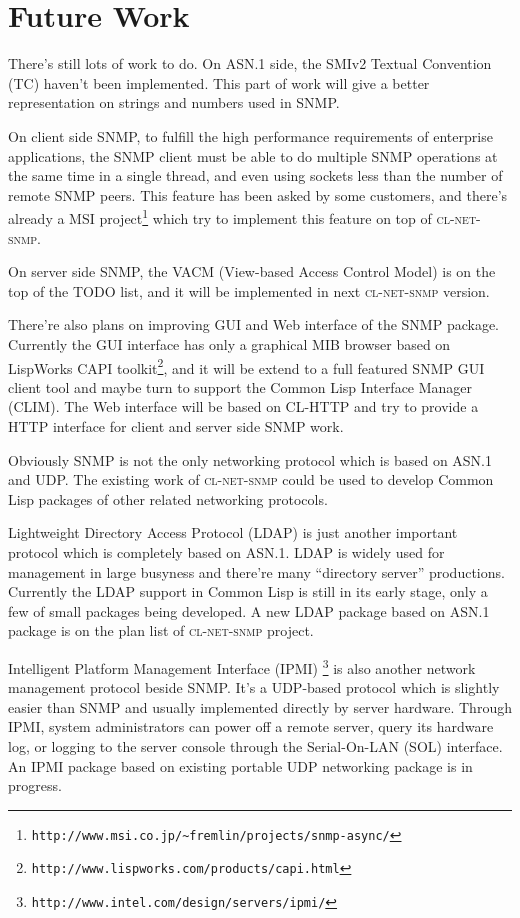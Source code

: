 \documentclass[reprint,9pt]{sigplanconf}
\begin{document}
\section{Future Work}

There's still lots of work to do. On ASN.1 side, the SMIv2
Textual Convention (TC) \cite{RFC:2579} haven't been implemented.
This part of work
will give a better representation on strings and numbers used in
SNMP.

On client side SNMP, to fulfill the high performance requirements
of enterprise applications, the SNMP client must be able to do
multiple SNMP operations at the same
time in a single thread, and even using sockets less than the number
of remote SNMP peers. This feature has been asked by some customers,
and there's already a MSI project\footnote{
\texttt{http://www.msi.co.jp/\~{}fremlin/projects/snmp-async/}} which try
to implement this feature on top of \textsc{cl-net-snmp}.

On server side SNMP, the VACM (View-based Access
Control Model) \cite{RFC:3415} is on the top of the TODO
list, and it will be implemented in next \textsc{cl-net-snmp} version.

There're also plans on improving GUI and Web interface of the SNMP package.
Currently the GUI interface has only a graphical MIB browser based on
LispWorks CAPI toolkit\footnote{
\texttt{http://www.lispworks.com/products/capi.html}}, and it will be
extend to a full featured SNMP GUI client tool and maybe turn to
support the Common Lisp Interface Manager (CLIM). The Web interface
will be based on CL-HTTP and try to provide a HTTP interface for client and 
server side SNMP work.

Obviously SNMP is not the only networking protocol which is based on
ASN.1 and UDP.  The existing work of \textsc{cl-net-snmp} could be
used to develop Common Lisp packages of other related networking
protocols.

Lightweight Directory Access Protocol (LDAP) \cite{RFC:4510}
is just another important
protocol which is completely based on ASN.1. LDAP is widely used for
management in large busyness and there're many ``directory server''
productions. Currently the LDAP support in Common Lisp is still in its
early stage, only a few of small packages being developed. A new LDAP
package based on ASN.1 package is on the plan list of
\textsc{cl-net-snmp} project.

Intelligent Platform Management Interface (IPMI) \footnote{
\texttt{http://www.intel.com/design/servers/ipmi/}} is also
another network management protocol beside SNMP. It's a UDP-based
protocol which is slightly easier than SNMP and usually implemented
directly by server hardware. Through IPMI, system administrators can
power off a remote server, query its hardware log, or logging to the
server console through the Serial-On-LAN (SOL) interface. An IPMI
package based on existing portable UDP networking package is in
progress.
\end{document}
